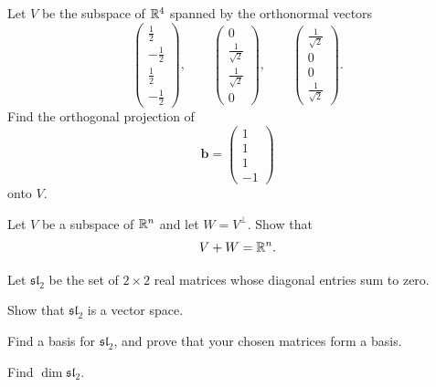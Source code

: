\documentclass[11pt,oneside]{article}
\begin{document}
\begin{problem}
Let $V$ be the subspace of $\mathbb{R}^4$ spanned by the orthonormal vectors
\[
\begin{pmatrix}\frac12\\-\frac12\\\frac12\\-\frac12\end{pmatrix},
\qquad
\begin{pmatrix}0\\\frac1{\sqrt2}\\\frac1{\sqrt2}\\0\end{pmatrix},
\qquad
\begin{pmatrix}\frac1{\sqrt2}\\0\\0\\\frac1{\sqrt2}\end{pmatrix}.
\]
Find the orthogonal projection of
\[
\mathbf b=
\begin{pmatrix}
1\\1\\1\\-1
\end{pmatrix}
\]
onto $V$.
\end{problem}

\begin{problem}
Let $V$ be a subspace of $\mathbb{R}^n$ and let $W=V^\perp$. Show that
\[
V+W=\mathbb{R}^n.
\]
\end{problem}

\begin{problem}
Let $\mathfrak{sl}_2$ be the set of $2\times2$ real matrices whose diagonal entries sum to zero.
\begin{problemsubparts}
\item Show that $\mathfrak{sl}_2$ is a vector space.
\item Find a basis for $\mathfrak{sl}_2$, and prove that your chosen matrices form a basis.
\item Find $\dim\mathfrak{sl}_2$.
\end{problemsubparts}
\end{problem}
\end{document}
